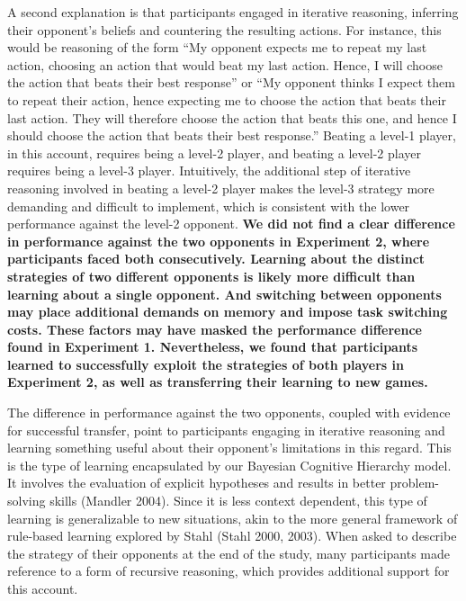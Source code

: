 \documentclass[smallextended]{svjour3}       %
\begin{document}
A second explanation is that participants engaged in iterative
reasoning, inferring their opponent's beliefs and countering the
resulting actions. For instance, this would be reasoning of the form
``My opponent expects me to repeat my last action, choosing an action
that would beat my last action. Hence, I will choose the action that
beats their best response'' or ``My opponent thinks I expect them to
repeat their action, hence expecting me to choose the action that beats
their last action. They will therefore choose the action that beats this
one, and hence I should choose the action that beats their best
response.'' Beating a level-1 player, in this account, requires being a
level-2 player, and beating a level-2 player requires being a level-3
player. Intuitively, the additional step of iterative reasoning involved
in beating a level-2 player makes the level-3 strategy more demanding
and difficult to implement, which is consistent with the lower
performance against the level-2 opponent. \textbf{We did not find a
clear difference in performance against the two opponents in Experiment
2, where participants faced both consecutively. Learning about the
distinct strategies of two different opponents is likely more difficult
than learning about a single opponent. And switching between opponents
may place additional demands on memory and impose task switching costs.
These factors may have masked the performance difference found in
Experiment 1. Nevertheless, we found that participants learned to
successfully exploit the strategies of both players in Experiment 2, as
well as transferring their learning to new games.}

The difference in performance against the two opponents, coupled with
evidence for successful transfer, point to participants engaging in
iterative reasoning and learning something useful about their opponent's
limitations in this regard. This is the type of learning encapsulated by
our Bayesian Cognitive Hierarchy model. It involves the evaluation of
explicit hypotheses and results in better problem-solving skills
(Mandler 2004). Since it is less context dependent, this type of
learning is generalizable to new situations, akin to the more general
framework of rule-based learning explored by Stahl (Stahl 2000, 2003).
When asked to describe the strategy of their opponents at the end of the
study, many participants made reference to a form of recursive
reasoning, which provides additional support for this account.
\end{document}
